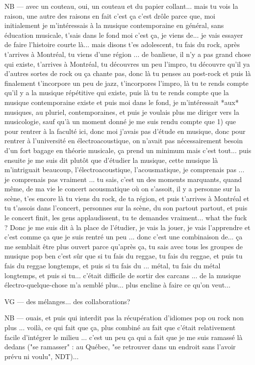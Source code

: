 NB — avec un couteau, oui, un couteau et du papier collant... mais tu vois la raison, une autre des raisons en fait c'est ça c'est drôle parce que, moi initialement je m'intéressais à la musique contemporaine en général, sans éducation musicale, t'sais dans le fond moi c'est ça, je viens de... je vais essayer de faire l'histoire courte là... mais disons t'es adolescent, tu fais du rock, après t'arrives à Montréal, tu viens d'une région ... de banlieue, il n'y a pas grand chose qui existe, t'arrives à Montréal, tu découvres un peu l'impro, tu découvre qu'il ya d'autres sortes de rock ou ça chante pas, donc là tu penses au post-rock et puis là finalement t'incorpore un peu de jazz, t'incorpores l'impro, là tu te rends compte qu'il y a la musique répétitive qui existe, puis là tu te rends compte que la musique contemporaine existe et puis moi dans le fond, je m'intéressait *aux* musiques, au pluriel, contemporaines, et puis je voulais plus me diriger vers la musicologie, sauf qu'à un moment donné je me suis rendu compte que 1) que pour rentrer à la faculté ici, donc moi j'avais pas d'étude en musique, donc pour rentrer à l'université en électroacoustique, on n'avait pas nécessairement besoin d'un fort bagage en théorie musicale, ça prend un minimum mais c'est tout... puis ensuite je me suis dit plutôt que d'étudier la musique, cette musique là m'intriguait beaucoup, l'électroacoustique, l'acousmatique, je comprenais pas ... je comprenais pas vraiment ... tu sais, c'est un des moments marquants, quand même, de ma vie le concert acousmatique où on s'assoit, il y a personne sur la scène, t'es encore là tu viens du rock, de ta région, et puis t'arrives à Montréal et tu t'assois dans l'concert, personnes sur la scène, du son partout partout, et puis le concert finit, les gens applaudissent,  tu te demandes vraiment... what the fuck ?  Donc je me suis dit à la place de l'étudier, je vais la jouer, je vais l'apprendre et c'est comme ça que je suis rentré un peu ... donc c'est une combinaison de... ça me semblait être plus ouvert parce qu'après ça, tu sais avec tous les groupes de musique pop ben c'est sûr que si tu fais du reggae, tu fais du reggae, et puis tu fais du reggae longtemps, et puis si tu fais du ... métal, tu fais du métal longtemps, et puis si tu...  c'était difficile de sortir des carcans ... de la musique électro-quelque-chose m'a semblé plus... plus encline à faire ce qu'on veut... 

VG — des mélanges... des collaborations?

NB — ouais, et puis qui interdit pas la récupération d'idiomes pop ou rock non plus ... voilà, ce qui fait que ça, plus combiné au fait que c'était relativement facile d'intégrer le milieu ... c'est un peu ça qui a fait que je me suis ramassé là dedans ("se ramasser" : au Québec, "se retrouver dans un endroit sans l'avoir prévu ni voulu", NDT)...

